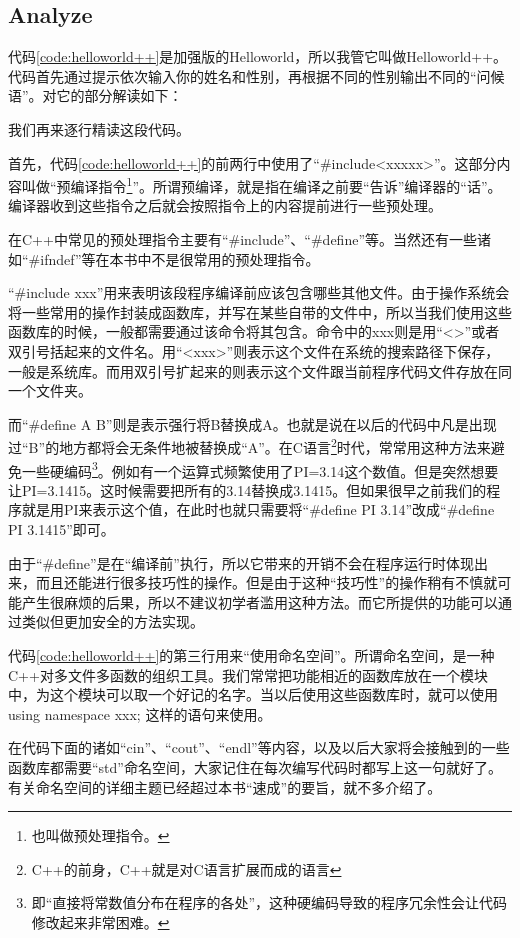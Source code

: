 \subsection{Analyze}
代码\ref{code:helloworld++}是加强版的Helloworld，所以我管它叫做Helloworld++。代码首先通过提示依次输入你的姓名和性别，再根据不同的性别输出不同的“问候语”。对它的部分解读如下：
\begin{quote}
\showremarks
\end{quote}

我们再来逐行精读这段代码。

首先，代码\ref{code:helloworld++}的前两行中使用了“\#include<xxxxx>”。这部分内容叫做“预编译指令\footnote{也叫做预处理指令。}”。所谓预编译，就是指在编译之前要“告诉”编译器的“话”。编译器收到这些指令之后就会按照指令上的内容提前进行一些预处理。

在C++中常见的预处理指令主要有“\#include”、“\#define”等。当然还有一些诸如“\#ifndef”等在本书中不是很常用的预处理指令。

“\#include xxx”用来表明该段程序编译前应该包含哪些其他文件。由于操作系统会将一些常用的操作封装成函数库，并写在某些自带的文件中，所以当我们使用这些函数库的时候，一般都需要通过该命令将其包含。命令中的xxx则是用“<>”或者双引号括起来的文件名。用“<xxx>”则表示这个文件在系统的搜索路径下保存，一般是系统库。而用双引号扩起来的则表示这个文件跟当前程序代码文件存放在同一个文件夹。

而“\#define A B”则是表示强行将B替换成A。也就是说在以后的代码中凡是出现过“B”的地方都将会无条件地被替换成“A”。在C语言\footnote{C++的前身，C++就是对C语言扩展而成的语言}时代，常常用这种方法来避免一些硬编码\footnote{即“直接将常数值分布在程序的各处”，这种硬编码导致的程序冗余性会让代码修改起来非常困难。}。例如有一个运算式频繁使用了PI=3.14这个数值。但是突然想要让PI=3.1415。这时候需要把所有的3.14替换成3.1415。但如果很早之前我们的程序就是用PI来表示这个值，在此时也就只需要将“\#define PI 3.14”改成“\#define PI 3.1415”即可。

由于“\#define”是在“编译前”执行，所以它带来的开销不会在程序运行时体现出来，而且还能进行很多技巧性的操作。但是由于这种“技巧性”的操作稍有不慎就可能产生很麻烦的后果，所以不建议初学者滥用这种方法。而它所提供的功能可以通过类似但更加安全的方法实现。

代码\ref{code:helloworld++}的第三行用来“使用命名空间”。所谓命名空间，是一种C++对多文件多函数的组织工具。我们常常把功能相近的函数库放在一个模块中，为这个模块可以取一个好记的名字。当以后使用这些函数库时，就可以使用using namespace xxx; 这样的语句来使用。

在代码下面的诸如“cin”、“cout”、“endl”等内容，以及以后大家将会接触到的一些函数库都需要“std”命名空间，大家记住在每次编写代码时都写上这一句就好了。有关命名空间的详细主题已经超过本书“速成”的要旨，就不多介绍了。

